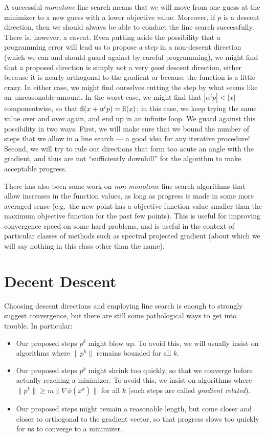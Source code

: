 \documentclass[12pt, leqno]{article} %
\begin{document}
A successful {\em monotone} line search means that we will move from
one guess at the minimizer to a new guess with a lower objective
value.  Moreover, if $p$ is a descent direction, then we should always
be able to conduct the line search successfully.  There is, however, a
caveat.  Even putting aside the possibility that a programming error
will lead us to propose a step in a non-descent direction (which we
can and should guard against by careful programming), we might find
that a proposed direction is simply not a very {\em good} descent
direction, either because it is nearly orthogonal to the gradient or
because the function is a little crazy.  In either case, we might find
ourselves cutting the step by what seems like an unreasonable amount.
In the worst case, we might find that $|\alpha^l p| < |x|$
componentwise, so that $\operatorname{fl}(x+\alpha^l p) = \operatorname{fl}(x)$; in this case, we
keep trying the same value over and over again, and end up in an
infinite loop.  We guard against this possibility in two ways.  First,
we will make sure that we bound the number of steps that we allow in a
line search --- a good idea for any iterative procedure!  Second, we
will try to rule out directions that form too acute an angle with the
gradient, and thus are not ``sufficiently downhill'' for the algorithm
to make acceptable progress.

There has also been some work on {\em non-monotone} line search
algorithms that allow increases in the function values, as long as
progress is made in some more averaged sense (e.g.~the new point
has a objective function value smaller than the maximum objective
function for the past few points).  This is useful for improving
convergence speed on some hard problems, and is useful in the context
of particular classes of methods such as spectral projected gradient
(about which we will say nothing in this class other than the name).

\section*{Decent Descent}

Choosing descent directions and employing line search is enough
to strongly suggest convergence, but there are still some pathological
ways to get into trouble.  In particular:
\begin{itemize}
\item Our proposed steps $p^k$ might blow up.  To avoid this, we will
  usually insist on algorithms where $\|p^k\|$ remains bounded for all
  $k$.
\item Our proposed steps $p^k$ might shrink too quickly, so that we
  converge before actually reaching a minimizer.  To avoid this,
  we insist on algorithms where $\|p^k\| \geq m \|\nabla \phi(x^k)\|$
  for all $k$ (such steps are called {\em gradient related}).
\item Our proposed steps might remain a reasonable length, but come
  closer and closer to orthogonal to the gradient vector, so that
  progress slows too quickly for us to converge to a minimizer.
\end{itemize}
\end{document}
